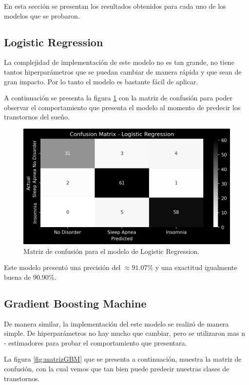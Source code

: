 \documentclass{replab}
\begin{document}
En esta sección se presentan los resultados obtenidos para cada uno de los modelos que se probaron.

    \subsection{Logistic Regression}

La complejidad de implementación de este modelo no es tan grande, no tiene tantos hiperparámetros que se puedan cambiar de manera rápida y que sean de gran impacto. Por lo tanto el modelo es bastante fácil de aplicar.

A continuación se presenta la figura \ref{fig:matrizLR} con la matriz de confusión para poder observar el comportamiento que presenta el modelo al momento de predecir los transtornos del sueño.

\begin{figure}[hbt!]
    \centering
    \includegraphics[width=0.85\columnwidth]{imagenes/LogisticRegression.png}
    \caption{Matriz de confusión para el modelo de Logistic Regression.}
    \label{fig:matrizLR}
\end{figure}

Este modelo presentó una precisión del $\approx 91.07\%$ y una exactitud igualmente buena de $90.90\%$.

    \subsection{Gradient Boosting Machine}

De manera similar, la implementación del este modelo se realizó de manera simple. De hiperparámetros no hay mucho que cambiar, pero se utilizaron mas n - estimadores para probar el comportamiento que presentara.

La figura \ref{fig:matrizGBM} que se presenta a continuación, muestra la matriz de confusión, con la cual vemos que tan bien puede predecir nuestras clases de transtornos.
\end{document}
